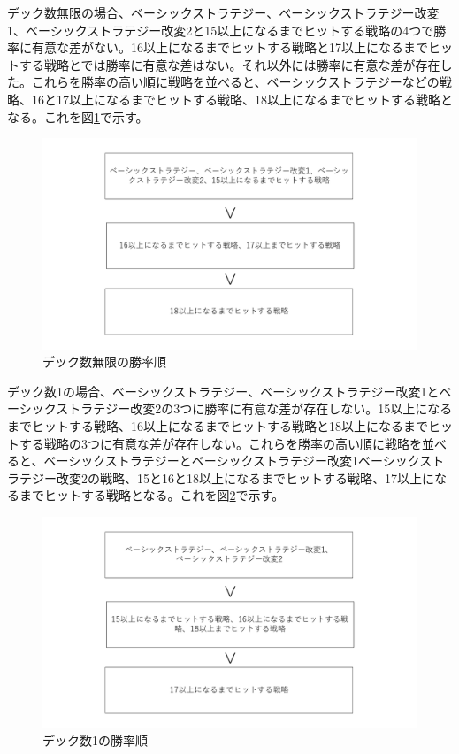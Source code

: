 デック数無限の場合、ベーシックストラテジー、ベーシックストラテジー改変1、ベーシックストラテジー改変2と15以上になるまでヒットする戦略の4つで勝率に有意な差がない。16以上になるまでヒットする戦略と17以上になるまでヒットする戦略とでは勝率に有意な差はない。それ以外には勝率に有意な差が存在した。これらを勝率の高い順に戦略を並べると、ベーシックストラテジーなどの戦略、16と17以上になるまでヒットする戦略、18以上になるまでヒットする戦略となる。これを図\ref{rate1}で示す。

\begin{figure}[H]
 \begin{center} 
  \includegraphics[width=0.7\linewidth]{./figure/rate1}
  \caption{デック数無限の勝率順\label{rate1}}
 \end{center}
\end{figure}

デック数1の場合、ベーシックストラテジー、ベーシックストラテジー改変1とベーシックストラテジー改変2の3つに勝率に有意な差が存在しない。15以上になるまでヒットする戦略、16以上になるまでヒットする戦略と18以上になるまでヒットする戦略の3つに有意な差が存在しない。これらを勝率の高い順に戦略を並べると、ベーシックストラテジーとベーシックストラテジー改変1ベーシックストラテジー改変2の戦略、15と16と18以上になるまでヒットする戦略、17以上になるまでヒットする戦略となる。これを図\ref{rate2}で示す。

\begin{figure}[H]
 \begin{center} 
  \includegraphics[width=0.7\linewidth]{./figure/rate2}
  \caption{デック数1の勝率順\label{rate2}}
 \end{center}
\end{figure}


